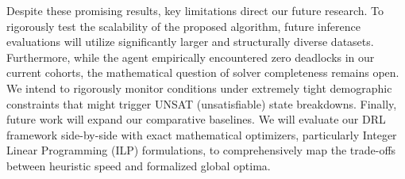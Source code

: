 \documentclass{icai2026} %
\begin{document}
Despite these promising results, key limitations direct our future research. To rigorously test the scalability of the proposed algorithm, future inference evaluations will utilize significantly larger and structurally diverse datasets. Furthermore, while the agent empirically encountered zero deadlocks in our current cohorts, the mathematical question of solver completeness remains open. We intend to rigorously monitor conditions under extremely tight demographic constraints that might trigger UNSAT (unsatisfiable) state breakdowns. Finally, future work will expand our comparative baselines. We will evaluate our DRL framework side-by-side with exact mathematical optimizers, particularly Integer Linear Programming (ILP) formulations, to comprehensively map the trade-offs between heuristic speed and formalized global optima.

\printbibliography
\end{document}
